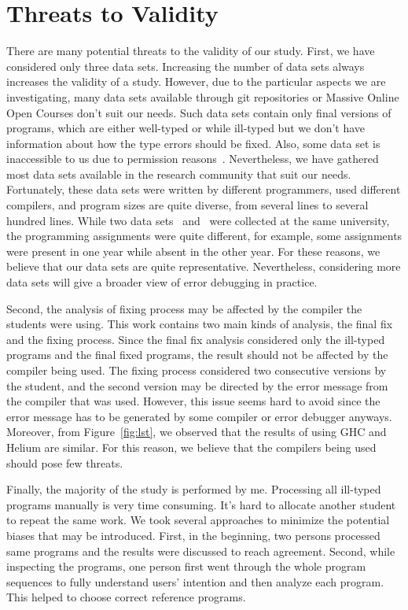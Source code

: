 \documentclass[12pt]{report}	%
\begin{document}
\section{Threats to Validity}
\label{sec:threat}

There are many potential threats to the validity of our study.
First, we have considered only three data sets. Increasing the
number of data sets always increases the validity
of a study. However, due to the particular aspects we are
investigating, many data sets available through git
repositories or Massive Online Open Courses don't
suit our needs. Such data sets contain only final
versions of programs, which are either well-typed or
while ill-typed but we don't have information about
how the type errors should be fixed. Also,
some data set is inaccessible to us due to
permission reasons~\cite{tirronen2015understanding}.
Nevertheless, we have gathered most data sets
available in the research community that suit
our needs. Fortunately, these data sets were written 
by different programmers,
used different compilers, and program sizes are quite
diverse, from several lines to several hundred lines.
While two data sets \benchf\ and \benchs\ were collected
at the same university, the programming assignments
were quite different, for example, some assignments
were present in one year while absent in the other year.
For these reasons, we believe that our data sets are quite
representative. Nevertheless, considering
more data sets will give a broader view of error debugging
in practice.


Second, the analysis of fixing process may be affected
by the compiler the students were using. This work
contains two main kinds of analysis, the final fix and the
fixing process. Since the final fix analysis
considered only the ill-typed programs and the final fixed
programs, the result should not be affected by the compiler
being used. The fixing process considered two consecutive
versions by the student, and the second version may
be directed by the error message from the compiler that
was used. However, this issue seems hard to avoid since the
error message has to be generated by some compiler or
error debugger anyways. Moreover, from Figure~\ref{fig:lst},
we observed that the results of using GHC and Helium are
similar. For this reason, we believe that the compilers being
used should pose few threats.


Finally, the majority of the study is performed by me. 
Processing all ill-typed programs
manually is very time consuming.
It's hard to allocate
another student to repeat the same work.
We took 
several approaches to minimize the potential biases that
may be introduced.
First, in the beginning, two persons processed
same programs and the results were discussed to
reach agreement. Second, while inspecting
the programs, one person first went through
the whole program sequences to fully understand
users' intention and then analyze each program.
This helped to choose correct reference programs.
\end{document}
